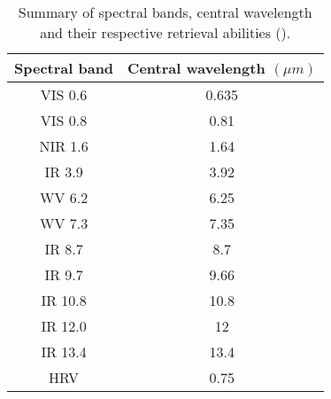 \begin{table}[]
    \centering
    \setlength\extrarowheight{-7pt}
    \begin{tabular}{c|c}
        Spectral band & Central wavelength $\left( \mu m  \right)$ \\ \hline
        VIS 0.6 & 0.635 \\
        VIS 0.8 & 0.81 \\
        NIR 1.6 & 1.64 \\
        IR 3.9 & 3.92 \\
        WV 6.2 & 6.25 \\
        WV 7.3 & 7.35 \\ 
        IR 8.7 & 8.7 \\
        IR 9.7 & 9.66 \\
        IR 10.8 & 10.8 \\
        IR 12.0 & 12 \\
        IR 13.4 & 13.4 \\
        HRV & 0.75
    \end{tabular}
    \caption{Summary of spectral bands, central wavelength and their respective retrieval abilities (\cite{Schmetz_meteosat_intro}).}
    \label{tab:msg_spectral_bands}
\end{table}